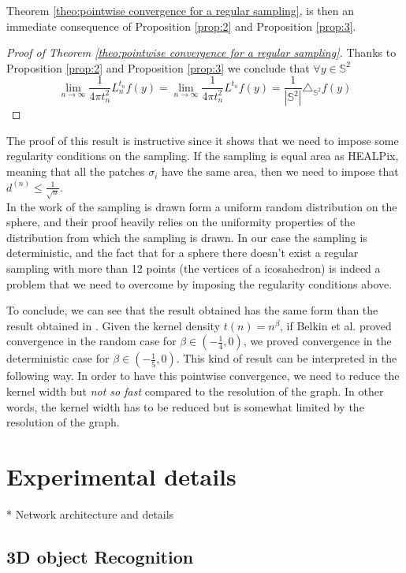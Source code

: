 \documentclass{article} %
\begin{document}
Theorem  \ref{theo:pointwise convergence for a regular sampling}, is then an immediate consequence of Proposition \ref{prop:2} and Proposition \ref{prop:3}.
\begin{proof}[Proof of Theorem \ref{theo:pointwise convergence for a regular sampling}]
	Thanks to Proposition \ref{prop:2} and Proposition \ref{prop:3}	we conclude that $\forall y\in\mathbb S^2 $
	$$\lim_{n\to\infty}\frac{1}{4\pi t_n^2} L_n^{t_n}f(y) =  \lim_{n\to\infty}\frac{1}{4\pi t_n^2} L^{t_n}f(y) = \frac{1}{|\mathbb S^2|}\triangle_{\mathbb S^2}f(y) $$
\end{proof}

The proof of this result is instructive since it shows that we need to impose some regularity conditions on the sampling. If the sampling is equal area as HEALPix, meaning that all the patches $\sigma_i$ have the same area, then we need to impose that $ d^{(n)}\leq \frac{1}{\sqrt{n}}$. \\
In the work of \cite{belkin2005towards} the sampling is drawn form a uniform random distribution on the sphere, and their proof heavily relies on the uniformity properties of the distribution from which the sampling is drawn. In our case the sampling is deterministic, and the fact that for a sphere there doesn't exist a regular sampling with more than 12 points (the vertices of a icosahedron) is indeed a problem that we need to overcome by imposing the regularity conditions above.

To conclude, we can see that the result obtained has the same form than the result obtained in \cite{belkin2005towards}. Given the kernel density $t(n)=n^\beta$, if Belkin et al. proved convergence in the random case for $\beta \in (-\frac{1}{4}, 0)$, we proved convergence in the deterministic case for $\beta \in (-\frac{1}{5}, 0)$. This kind of result can be interpreted in the following way. In order to have this pointwise convergence, we need to reduce the kernel width but \emph{not so fast} compared to the resolution of the graph. In other words, the kernel width has to be reduced but is somewhat limited by the resolution of the graph.


\section{Experimental details}

* Network architecture and details

\subsection{3D object Recognition}
\end{document}

